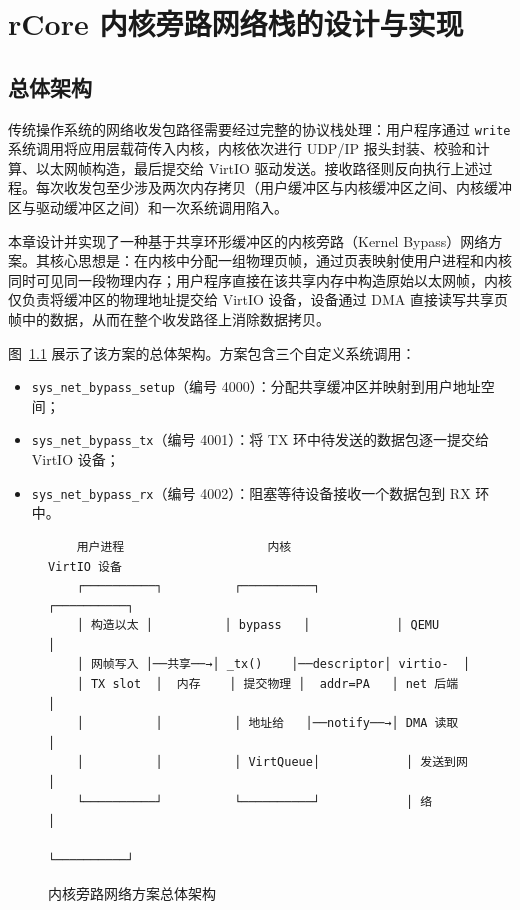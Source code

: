 \chapter{rCore 内核旁路网络栈的设计与实现}

\section{总体架构}

传统操作系统的网络收发包路径需要经过完整的协议栈处理：用户程序通过 \texttt{write} 系统调用将应用层载荷传入内核，内核依次进行 UDP/IP 报头封装、校验和计算、以太网帧构造，最后提交给 VirtIO 驱动发送。接收路径则反向执行上述过程。每次收发包至少涉及两次内存拷贝（用户缓冲区与内核缓冲区之间、内核缓冲区与驱动缓冲区之间）和一次系统调用陷入。

本章设计并实现了一种基于共享环形缓冲区的内核旁路（Kernel Bypass）网络方案。其核心思想是：在内核中分配一组物理页帧，通过页表映射使用户进程和内核同时可见同一段物理内存；用户程序直接在该共享内存中构造原始以太网帧，内核仅负责将缓冲区的物理地址提交给 VirtIO 设备，设备通过 DMA 直接读写共享页帧中的数据，从而在整个收发路径上消除数据拷贝。

图~\ref{fig:bypass-arch} 展示了该方案的总体架构。方案包含三个自定义系统调用：
\begin{itemize}
    \item \texttt{sys\_net\_bypass\_setup}（编号 4000）：分配共享缓冲区并映射到用户地址空间；
    \item \texttt{sys\_net\_bypass\_tx}（编号 4001）：将 TX 环中待发送的数据包逐一提交给 VirtIO 设备；
    \item \texttt{sys\_net\_bypass\_rx}（编号 4002）：阻塞等待设备接收一个数据包到 RX 环中。
\end{itemize}

\begin{figure}[htbp]
    \centering
    \begin{verbatim}
    用户进程                    内核                     VirtIO 设备
    ┌──────────┐          ┌──────────┐            ┌──────────┐
    │ 构造以太 │          │ bypass   │            │ QEMU     │
    │ 网帧写入 │──共享──→│ _tx()    │──descriptor│ virtio-  │
    │ TX slot  │  内存    │ 提交物理 │  addr=PA   │ net 后端 │
    │          │          │ 地址给   │──notify──→│ DMA 读取 │
    │          │          │ VirtQueue│            │ 发送到网 │
    └──────────┘          └──────────┘            │ 络       │
                                                  └──────────┘
    \end{verbatim}
    \caption{内核旁路网络方案总体架构}
    \label{fig:bypass-arch}
\end{figure}

